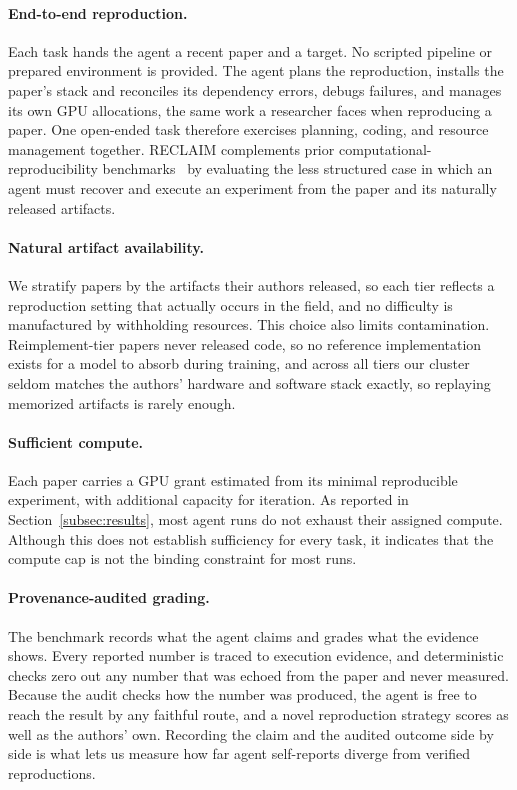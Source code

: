 \documentclass{article} %
\begin{document}
\paragraph{End-to-end reproduction.} Each task hands the agent a recent
paper and a target. No scripted pipeline or prepared environment is
provided. The agent plans the reproduction, installs the paper's stack and
reconciles its dependency errors, debugs failures, and manages its own GPU
allocations, the same work a researcher faces when reproducing a paper. One
open-ended task therefore exercises planning, coding, and resource
management together. RECLAIM complements prior computational-reproducibility
benchmarks~\citep{siegel2024corebench} by evaluating the less structured case
in which an agent must recover and execute an experiment from the paper and its
naturally released artifacts.

\paragraph{Natural artifact availability.} We stratify papers by the artifacts
their authors released, so each tier reflects a reproduction setting that
actually occurs in the field, and no difficulty is manufactured by
withholding resources. This choice also limits contamination.
Reimplement-tier papers never released code, so no reference implementation
exists for a model to absorb during training, and across all tiers our
cluster seldom matches the authors' hardware and software stack exactly, so
replaying memorized artifacts is rarely enough.

\paragraph{Sufficient compute.} Each paper carries a GPU grant estimated from
its minimal reproducible experiment, with additional capacity for iteration. As
reported in Section~\ref{subsec:results}, most agent runs do not exhaust their
assigned compute. Although this does not establish sufficiency for every task,
it indicates that the compute cap is not the binding constraint for most runs.

\paragraph{Provenance-audited grading.} The benchmark records what the
agent claims and grades what the evidence shows. Every reported number is
traced to execution evidence, and deterministic checks zero out any number
that was echoed from the paper and never measured. Because the audit checks how
the number was produced, the
agent is free to reach the result by any faithful route, and a novel
reproduction strategy scores as well as the authors' own. Recording the
claim and the audited outcome side by side is what lets us measure how far
agent self-reports diverge from verified reproductions.
\end{document}
